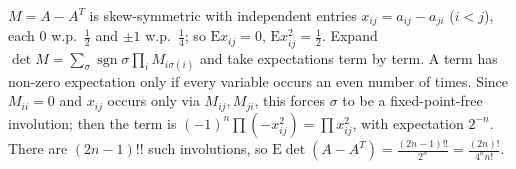 \documentclass[11pt,a4paper]{article}
\begin{document}
 $M=A-A^T$ is skew-symmetric with independent entries $x_{ij}=a_{ij}-a_{ji}$ ($i<j$), each $0$ w.p.\ $\frac12$ and $\pm1$ w.p.\ $\frac14$; so $\mathrm Ex_{ij}=0$, $\mathrm Ex_{ij}^2=\frac12$. Expand $\det M=\sum_\sigma\operatorname{sgn}\sigma\prod_iM_{i\sigma(i)}$ and take expectations term by term.
 A term has non-zero expectation only if every variable occurs an even number of times. Since $M_{ii}=0$ and $x_{ij}$ occurs only via $M_{ij},M_{ji}$, this forces $\sigma$ to be a fixed-point-free involution; then the term is $(-1)^n\prod(-x_{ij}^2)=\prod x_{ij}^2$, with expectation $2^{-n}$.
 There are $(2n-1)!!$ such involutions, so $\mathrm E\det(A-A^T)=\frac{(2n-1)!!}{2^n}=\frac{(2n)!}{4^nn!}$.
\end{document}

